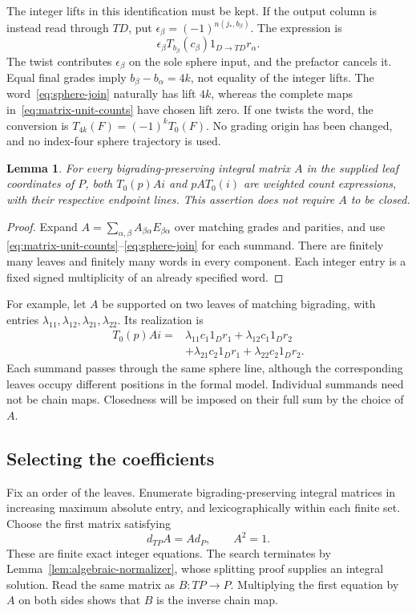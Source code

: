 \documentclass[11pt]{amsart}
\newtheorem{lemma}[theorem]{Lemma}
\theoremstyle{definition}
\theoremstyle{remark}
\theoremstyle{plain}
\begin{document}
The integer lifts in this identification must be kept. If the
output column is instead read through $TD$, put
$\epsilon_\beta=(-1)^{n(j_*,b_\beta)}$. The expression is
\begin{equation}\label{eq:column-twist}
 \epsilon_\beta T_{b_\beta}(c_\beta)
                 1_{D\to TD}r_\alpha.
\end{equation}
The twist contributes $\epsilon_\beta$ on the sole sphere
input, and the prefactor cancels it. Equal final grades imply
$b_\beta-b_\alpha=4k$, not equality of the integer lifts.
The word~\eqref{eq:sphere-join} naturally has lift $4k$,
whereas the complete maps in~\eqref{eq:matrix-unit-counts}
have chosen lift zero. If one twists the word, the conversion
is $T_{4k}(F)=(-1)^kT_0(F)$. No grading origin has been changed,
and no index-four sphere trajectory is used.

\begin{lemma}\label{lem:spanning}
For every bigrading-preserving integral matrix $A$ in the supplied
leaf coordinates of $P$, both $T_0(p)Ai$ and $pA T_0(i)$ are
weighted count expressions, with their respective endpoint lines.
This assertion does not require $A$ to be closed.
\end{lemma}
\begin{proof}
Expand $A=\sum_{\alpha,\beta}A_{\beta\alpha}E_{\beta\alpha}$
over matching grades and parities, and use
\eqref{eq:matrix-unit-counts}--\eqref{eq:sphere-join} for each
summand. There are finitely many leaves and finitely many words
in every component. Each integer entry is a fixed signed
multiplicity of an already specified word.
\end{proof}

For example, let $A$ be supported on two leaves of matching
bigrading, with entries $\lambda_{11},\lambda_{12},\lambda_{21},
\lambda_{22}$. Its realization is
\begin{align*}
 T_0(p)Ai={}&\lambda_{11}c_1 1_Dr_1+
             \lambda_{12}c_1 1_Dr_2\\
           &+\lambda_{21}c_2 1_Dr_1+
             \lambda_{22}c_2 1_Dr_2.
\end{align*}
Each summand passes through the same sphere line, although the
corresponding leaves occupy different positions in the formal
model. Individual summands need not be chain maps. Closedness
will be imposed on their full sum by the choice of $A$.

\subsection{Selecting the coefficients}
Fix an order of the leaves. Enumerate bigrading-preserving
integral matrices in increasing maximum absolute entry, and
lexicographically within each finite set. Choose the first
matrix satisfying
\begin{equation}\label{eq:select-normalizer}
 d_{TP}A=Ad_P,\qquad A^2=1.
\end{equation}
These are finite exact integer equations. The search terminates
by Lemma~\ref{lem:algebraic-normalizer}, whose splitting proof
supplies an integral solution. Read the same matrix as
$B:TP\to P$. Multiplying the first equation by $A$ on both
sides shows that $B$ is the inverse chain map.
\end{document}
